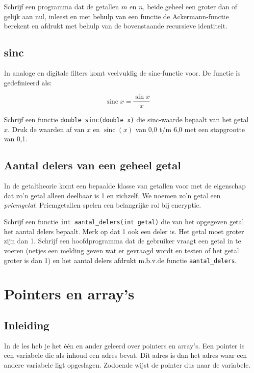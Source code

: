 \documentclass[a4paper,10pt,fleqn,twoside]{article}
\DeclareMathOperator{\sinc}{sinc}
\begin{document}
Schrijf een programma dat de getallen $m$ en $n$, beide geheel een groter dan of gelijk aan nul, inleest en met behulp van een functie de Ackermann-functie berekent en afdrukt met behulp van de bovenstaande recursieve identiteit.

\subsection{sinc}
In analoge en digitale filters komt veelvuldig de sinc-functie voor. De functie is gedefinieerd als:

\begin{equation*}
\sinc x= \dfrac{\sin x}{x}
\end{equation*}

Schrijf een functie \lstinline|double sinc(double x)| die sinc-waarde bepaalt van het getal $x$. Druk de waarden af van $x$ en $\sinc(x)$ van 0,0 t/m 6,0 met een stapgrootte van 0,1.

\subsection{Aantal delers van een geheel getal}
In de getaltheorie komt een bepaalde klasse van getallen voor met de eigenschap dat zo'n getal alleen deelbaar is 1 en zichzelf. We noemen zo'n getal een \textsl{priemgetal}. Priemgetallen spelen een belangrijke rol bij encryptie.

Schrijf een functie \lstinline|int aantal_delers(int getal)| die van het opgegeven getal het aantal delers bepaalt. Merk op dat 1 ook een deler is. Het getal moet groter zijn dan 1. Schrijf een hoofdprogramma dat de gebruiker vraagt een getal in te voeren (netjes een melding geven wat er gevraagd wordt en testen of het getal groter is dan 1) en het aantal delers afdrukt m.b.v.\@ de functie \lstinline|aantal_delers|.


\section{Pointers en array's}

\subsection{Inleiding}
\label{sec:inleidingpointers}
In de les heb je het één en ander geleerd over pointers en array’s. Een pointer is een variabele die als inhoud een adres bevat. Dit adres is dan het adres waar een andere variabele ligt opgeslagen. Zodoende wijst de pointer dus naar de variabele.
\end{document}
